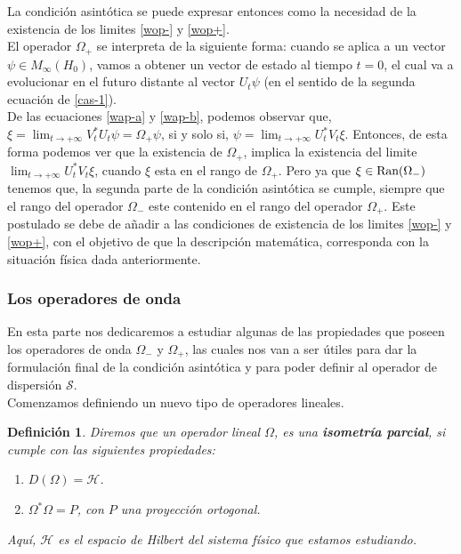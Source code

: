 \documentclass[12pt]{book}
\numberwithin{equation}{chapter}
\newtheorem{definition}[theorem]{Definici\'on}
\def\S{\mathcal{S}}
\def\rar{\rightarrow}
\def\H{\mathcal{H}}
\begin{document}
La condici\'on asint\'otica se puede expresar entonces como la necesidad de la existencia de los limites \eqref{wop-} y \eqref{wop+}.\\ 
El operador $\Omega_{+}$ se interpreta de la siguiente forma: cuando se aplica a un vector $\psi \in M_{\infty}(H_{0})$, vamos a obtener un vector de estado al tiempo $t=0$, el cual va a evolucionar en el futuro distante al vector $U_{t}\psi$ (en el sentido de la segunda ecuaci\'on de \eqref{cas-1}).\\
De las ecuaciones \eqref{wap-a} y \eqref{wap-b}, podemos observar que, $ \xi = \lim_{t \rar + \infty} V_{t}^{*}U_{t} \psi = \Omega_{+} \psi$, si y solo si, $\psi = \lim_{t \rar +\infty} U_{t}^{*}V_{t}\xi $. Entonces, de esta forma podemos ver que la existencia de $\Omega_{+}$, implica la existencia del limite $ \lim_{t \rar +\infty } U_{t}^{*}V_{t} \xi $, cuando $\xi$ esta en el rango de $\Omega_{+}$. Pero ya que $\xi \in \hbox{Ran}(\Omega_{-})$ tenemos que, la segunda parte de la condici\'on asint\'otica se cumple, siempre que el rango del operador $\Omega_{-}$ este contenido en el rango del operador $\Omega_{+}$. Este postulado se debe de a\~nadir a las condiciones de existencia de los limites \eqref{wop-} y \eqref{wop+}, con el objetivo de que la descripci\'on matem\'atica, corresponda con la situaci\'on f\'isica dada anteriormente.\\


\newpage

\subsubsection{Los operadores de onda}
En esta parte nos dedicaremos a estudiar algunas de las propiedades que poseen los operadores de onda $\Omega_{-}$ y $\Omega_{+}$, las cuales nos van a ser \'utiles para dar la formulaci\'on final de la condici\'on asint\'otica y para poder definir al operador de dispersi\'on $\S$.\\ 
Comenzamos definiendo un nuevo tipo de operadores lineales.
\begin{definition}
Diremos que un operador lineal $\Omega$, es una {\bf isometr\'ia parcial}, si cumple con las siguientes propiedades:
\begin{enumerate}
\item $D(\Omega)= \H$.
\item $\Omega^{*} \Omega= P $, con $P$ una proyecci\'on ortogonal.
\end{enumerate}
Aqu\'i, $\H$ es el espacio de Hilbert del sistema f\'isico que estamos estudiando.
\end{definition}
\end{document}
